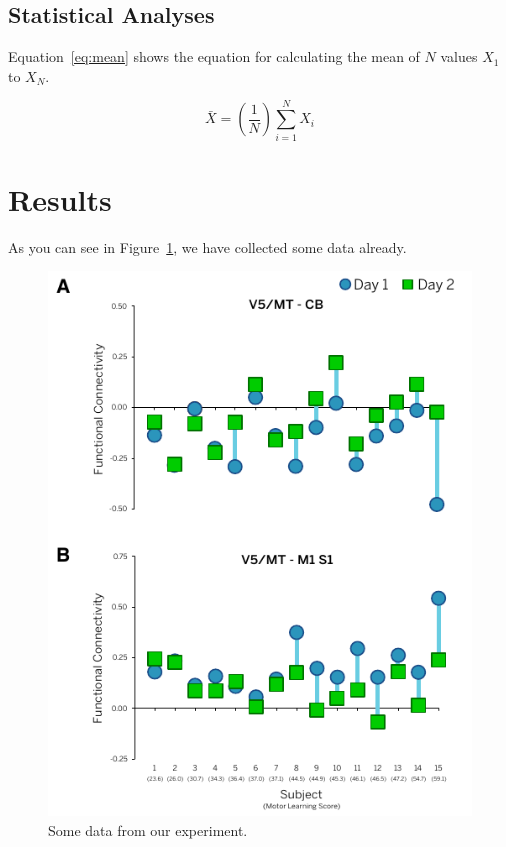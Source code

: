 \documentclass[twocolumn,letterpaper]{article}
\begin{document}
\lipsum[1-5]

\subsection*{Statistical Analyses}

Equation~\ref{eq:mean} shows the equation for calculating the mean of
$N$ values $X_{1}$ to $X_{N}$.

\begin{equation}
  \bar{X} = \left( \frac{1}{N}  \right) \sum_{i=1}^{N} X_{i}
  \label{eq:mean}
\end{equation}


\lipsum[1]

\section*{Results}

As you can see in Figure~\ref{fig:subjectmeans}, we have collected
some data already.

\begin{figure}
  \centering
  \includegraphics[width=\columnwidth]{figure.pdf}
  \caption{Some data from our experiment.}
  \label{fig:subjectmeans}
\end{figure}    
\end{document}
